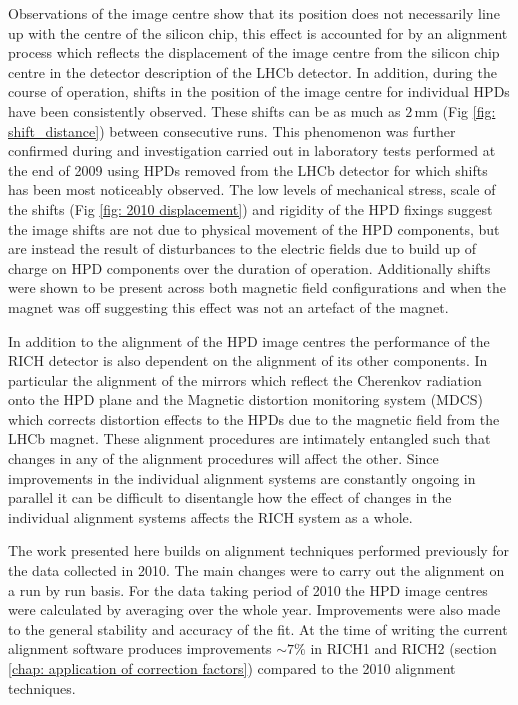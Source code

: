 Observations of the image centre show that its position does not necessarily line up with the centre of the silicon chip, this effect is accounted for by an alignment process which reflects the displacement of the image centre from the silicon chip centre in the detector description of the LHCb detector. In addition, during the course of operation, shifts in the position of the image centre for individual HPDs have been consistently observed. These shifts can be as much as $2\,\mathrm{mm}$ (Fig \ref{fig: shift_distance}) between consecutive runs. This phenomenon was further confirmed during and investigation carried out in laboratory tests performed at the end of 2009 using HPDs removed from the LHCb detector for which shifts has been most noticeably observed. The low levels of mechanical stress, scale of the shifts (Fig \ref{fig: 2010 displacement}) and rigidity of the HPD fixings suggest the image shifts are not due to physical movement of the HPD components, but are instead the result of disturbances to the electric fields due to build up of charge on HPD components over the duration of operation. Additionally shifts were shown to be present across both magnetic field configurations and when the magnet was off suggesting this effect was not an artefact of the magnet.

In addition to the alignment of the HPD image centres the performance of the RICH detector is also dependent on the alignment of its other components. In particular the alignment of the mirrors which reflect the Cherenkov radiation onto the HPD plane and the Magnetic distortion monitoring system (MDCS) which corrects distortion effects to the HPDs due to the magnetic field from the LHCb magnet. These alignment procedures are intimately entangled such that changes in any of the alignment procedures will affect the other. Since improvements in the individual alignment systems are constantly ongoing in parallel it can be difficult to disentangle how the effect of changes in the individual alignment systems affects the RICH system as a whole. 

The work presented here builds on alignment techniques performed previously for the data collected in 2010. The main changes were to carry out the alignment on a run by run basis. For the data taking period of 2010 the HPD image centres were calculated by averaging over the whole year. Improvements were also made to the general stability and accuracy of the fit. At the time of writing the current alignment software produces improvements $\sim7\%$ in RICH1 and RICH2 (section \ref{chap: application of correction factors}) compared to the 2010 alignment techniques.

